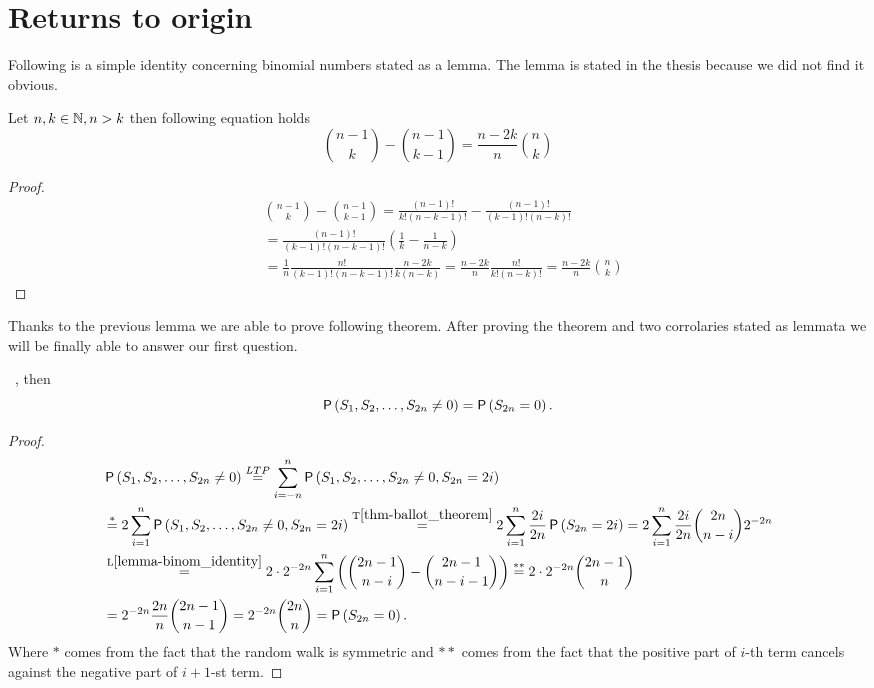 \chapter{Returns to origin}
\begin{rem}
  Following is a simple identity concerning binomial numbers stated as a lemma. The lemma is stated in the thesis because we did not find it obvious.
\end{rem}
\begin{lemma}\label{lemma-binom_identity}
 Let $n,k \in \mathbb{N}, n>k$ then following equation holds
 \[
 \binom{n-1}{k}-\binom{n-1}{k-1}=\frac{n-2k}{n}\binom{n}{k}
 \]
\end{lemma}
\begin{proof}
  \[
  \begin{split}
    & \binom{n-1}{k}-\binom{n-1}{k-1}
     =\frac{ \left( n-1 \right) !}{k! \left( n-k-1 \right) !}-\frac{ \left( n-1 \right) !}{ \left( k-1 \right) ! \left( n-k \right) !}\\
    & =\frac{ \left( n-1 \right) !}{ \left( k-1 \right) ! \left( n-k-1 \right) !} \left( \frac{1}{k}-\frac{1}{n-k} \right)\\
    & =\frac{1}{n}\frac{n!}{ \left( k-1 \right) ! \left( n-k-1 \right) !}\frac{n-2k}{k \left( n-k \right) }
    =\frac{n-2k}{n}\frac{n!}{k! \left( n-k \right) !}=\frac{n-2k}{n}\binom{n}{k}
     \end{split}
  \]
\end{proof}
\begin{rem}
  Thanks to the previous lemma we are able to prove following theorem. After proving the theorem and two corrolaries stated as lemmata we will be finally able to answer our first question.
\end{rem}
\begin{thm}\label{thm-no_return=return}
 \Lrws\ , then
 \[
   \operatorname{\mathsf{P}} \left( S_1, S_2, \ldots, S_{2n}\neq 0 \right) =\operatorname{\mathsf{P}} \left( S_{2n}=0 \right).
  \]
\end{thm}
\begin{proof}
  \[
  \begin{split}
    & \pr \left(S_1, S_2, \ldots, S_{2n}\neq 0 \right)
    \ltp \suma[i][-n][n] \pr \left( S_1 , S_2, \ldots, S_{2n}\neq 0, S_{2n}=2i \right)\\
    & \overset{*}{=}2\suma \pr \left( S_1 , S_2, \ldots, S_{2n}\neq 0, S_{2n}=2i \right)
     \overset{\text{T}\ref{thm-ballot_theorem}}{=}2\suma \frac{2i}{2n}\pr \left( S_{2n}=2i \right) =2\suma \frac{2i}{2n}\binom{2n}{n-i}2^{-2n}\\
    & \overset{\text{L}\ref{lemma-binom_identity}}{=} 2\cdot 2^{-2n}\suma \left( \binom{2n-1}{n-i}-\binom{2n-1}{n-i-1} \right) \overset{**}{=}2\cdot 2^{-2n}\binom{2n-1}{n}\\
    &=2^{-2n}\frac{2n}{n}\binom{2n-1}{n-1}
  =2^{-2n}\binom{2n}{n}=\pr \left( S_{2n}=0 \right).
  \end{split}
  \]
  Where $*$ comes from the fact that the random walk is symmetric and $**$ comes from the fact that the positive part of $i$-th term cancels against the negative part of $i+1$-st term.
\end{proof}



